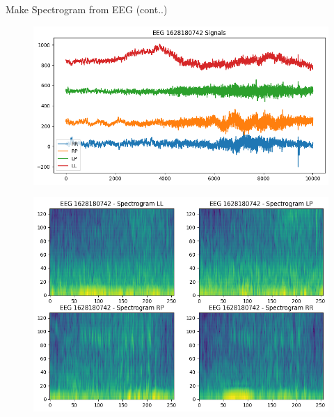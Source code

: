 \documentclass[leqno]{beamer}
\begin{document}


\begin{frame}{Make Spectrogram from EEG (cont..)}
\begin{figure}[tbp]
\centering
\vspace{-.5em}
\includegraphics[width=.5\textwidth]{EEG_Signal}
\end{figure}
\vspace{-1em}
\begin{figure}[tbp]
\centering
\includegraphics[width=.55\textwidth]{EEG_Spectrogram}
\end{figure}
\end{frame}
\end{document}

